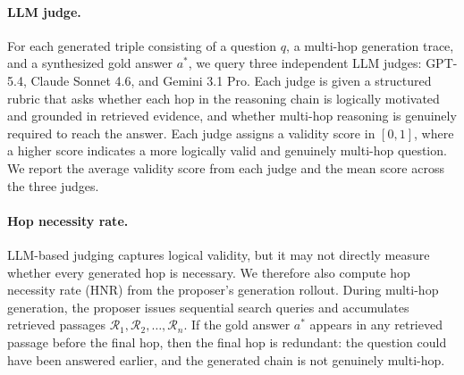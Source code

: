 \documentclass{article}
\begin{document}
\paragraph{LLM judge.}
For each generated triple consisting of a question $q$, a multi-hop generation
trace, and a synthesized gold answer $a^\ast$, we query three independent LLM
judges: GPT-5.4, Claude Sonnet 4.6, and Gemini 3.1 Pro. Each judge is given a
structured rubric that asks whether each hop in the reasoning chain is
logically motivated and grounded in retrieved evidence, and whether multi-hop
reasoning is genuinely required to reach the answer. Each judge assigns a
validity score in $[0,1]$, where a higher score indicates a more logically
valid and genuinely multi-hop question. We report the average validity score
from each judge and the mean score across the three judges.

\paragraph{Hop necessity rate.}
LLM-based judging captures logical validity, but it may not directly measure
whether every generated hop is necessary. We therefore also compute hop
necessity rate (HNR) from the proposer's generation rollout. During multi-hop
generation, the proposer issues sequential search queries and accumulates
retrieved passages $\mathcal{R}_1,\mathcal{R}_2,\ldots,\mathcal{R}_n$. If the
gold answer $a^\ast$ appears in any retrieved passage before the final hop, then
the final hop is redundant: the question could have been answered earlier, and
the generated chain is not genuinely multi-hop.
\end{document}
